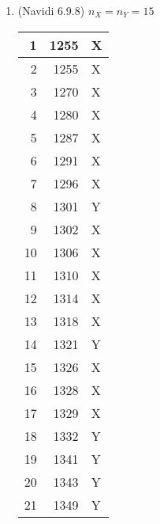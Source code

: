 \documentclass[11pt]{article}
\begin{document}
\begin{enumerate}
        \newpage
        \item (Navidi 6.9.8) $n_X = n_Y = 15$
        \begin{table}[h]
          \begin{tabular}{|r|r|l|}
          \hline
          1                        & 1255                    & X \\ \hline
          2                        & 1255                    & X \\ \hline
          3                        & 1270                    & X \\ \hline
          4                        & 1280                    & X \\ \hline
          5                        & 1287                    & X \\ \hline
          6                        & 1291                    & X \\ \hline
          7                        & 1296                    & X \\ \hline
          8                        & 1301                    & Y \\ \hline
          9                        & 1302                    & X \\ \hline
          10                       & 1306                    & X \\ \hline
          11                       & 1310                    & X \\ \hline
          12                       & 1314                    & X \\ \hline
          13                       & 1318                    & X \\ \hline
          14                       & 1321                    & Y \\ \hline
          15                       & 1326                    & X \\ \hline
          16                       & 1328                    & X \\ \hline
          17                       & 1329                    & X \\ \hline
          18                       & 1332                    & Y \\ \hline
          19                       & 1341                    & Y \\ \hline
          20                       & 1343                    & Y \\ \hline
          21                       & 1349                    & Y \\ \hline

\end{tabular}
\end{table}
\end{enumerate}
\end{document}
